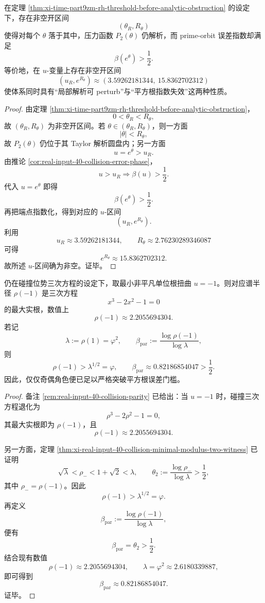 \begin{corollary}[解析超临界窗的存在]\label{cor:xi-time-part9zm-analytic-supercritical-window}
在定理 \ref{thm:xi-time-part9zm-rh-threshold-before-analytic-obstruction} 的设定下，存在非空开区间
\[
(\theta_R,R_\theta)
\]
使得对每个 \(\theta\) 落于其中，压力函数 \(P_2(\theta)\) 仍解析，而 prime-orbit 误差指数却满足
\[
\beta(e^\theta)>\frac12.
\]
等价地，在 \(u\)-变量上存在非空开区间
\[
(u_R,e^{R_\theta})
\approx
(3.59262181344,\ 15.8362702312)
\]
使体系同时具有“局部解析可 perturb”与“平方根指数失效”这两种性质。
\end{corollary}
\begin{proof}
由定理 \ref{thm:xi-time-part9zm-rh-threshold-before-analytic-obstruction}，
\[
0<\theta_R<R_\theta,
\]
故 \((\theta_R,R_\theta)\) 为非空开区间。若 \(\theta\in(\theta_R,R_\theta)\)，则一方面
\[
|\theta|<R_\theta,
\]
故 \(P_2(\theta)\) 仍位于其 Taylor 解析圆盘内；另一方面
\[
u=e^\theta>u_R.
\]
由推论 \ref{cor:real-input-40-collision-error-phase}，
\[
u>u_R\Longrightarrow \beta(u)>\frac12.
\]
代入 \(u=e^\theta\) 即得
\[
\beta(e^\theta)>\frac12.
\]
再把端点指数化，得到对应的 \(u\)-区间
\[
(u_R,e^{R_\theta}).
\]
利用
\[
u_R\approx 3.59262181344,
\qquad
R_\theta\approx 2.76230289346087
\]
可得
\[
e^{R_\theta}\approx 15.8362702312.
\]
故所述 \(u\)-区间确为非空。证毕。
\end{proof}

\begin{theorem}[最小非平凡角色已足以打破平方根律]\label{thm:xi-time-part9zm-parity-character-breaks-square-root-barrier}
仍在碰撞位势三次方程的设定下，取最小非平凡单位根扭曲 \(u=-1\)。则对应谱半径 \(\rho(-1)\) 是三次方程
\[
x^3-2x^2-1=0
\]
的最大实根，数值上
\[
\rho(-1)\approx 2.2055694304.
\]
若记
\[
\lambda:=\rho(1)=\varphi^2,
\qquad
\beta_{\mathrm{par}}
:=
\frac{\log \rho(-1)}{\log\lambda},
\]
则
\[
\rho(-1)>\lambda^{1/2}=\varphi,
\qquad
\beta_{\mathrm{par}}\approx 0.82186854047>\frac12.
\]
因此，仅仅奇偶角色便已足以严格突破平方根误差门槛。
\end{theorem}
\begin{proof}
备注 \ref{rem:real-input-40-collision-parity} 已给出：当 \(u=-1\) 时，碰撞三次方程退化为
\[
\rho^3-2\rho^2-1=0,
\]
其最大实根即为 \(\rho(-1)\)，且
\[
\rho(-1)\approx 2.2055694304.
\]

另一方面，定理 \ref{thm:xi-real-input-40-collision-minimal-modulus-two-witness} 已证明
\[
\sqrt{\lambda}<\rho_-<1+\sqrt2<\lambda,
\qquad
\theta_2:=\frac{\log \rho_-}{\log\lambda}>\frac12,
\]
其中 \(\rho_-=\rho(-1)\)。因此
\[
\rho(-1)>\lambda^{1/2}=\varphi.
\]
再定义
\[
\beta_{\mathrm{par}}:=\frac{\log \rho(-1)}{\log\lambda},
\]
便有
\[
\beta_{\mathrm{par}}=\theta_2>\frac12.
\]
结合现有数值
\[
\rho(-1)\approx 2.2055694304,
\qquad
\lambda=\varphi^2\approx 2.6180339887,
\]
即可得到
\[
\beta_{\mathrm{par}}\approx 0.82186854047.
\]
证毕。
\end{proof}

